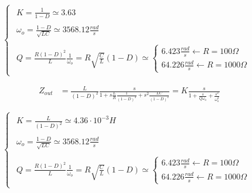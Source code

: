 \documentclass{article}
\begin{document}
\vspace{0.5em}
\[
\begin{cases}
    \begin{aligned}
       K = \frac{1}{1-D} \simeq 3.63
    \end{aligned}
       \\[2em]
    \begin{aligned}
       \omega_o = \frac{1-D}{\sqrt{LC}} \simeq 3568.12 \frac{rad}{s}
    \end{aligned}
       \\[2em]
    \begin{aligned}
       Q = \frac{R(1-D)^2}{L} \frac{1}{\omega_o} = R \sqrt{\frac{C}{L}}(1-D) \simeq 
        \begin{cases}
            6.423 \frac{rad}{s} \xleftarrow{} R = 100 \Omega \\
            64.226 \frac{rad}{s} \xleftarrow{} R = 1000 \Omega
        \end{cases}
    \end{aligned}
\end{cases}
\]
\vspace{0.5em}

\vspace{0.5em}
\begin{align*}
    Z_{out} &= \frac{L}{(1-D)^2}\frac{s}{1 + s \frac{L}{R}\frac{1}{(1-D)^2} + s^2 \frac{LC}{(1-D)^2}} = K \frac{s}{1+\frac{s}{Q \omega_o} + \frac{s^2}{\omega_o^2}}
\end{align*}
\vspace{0.5em}

\vspace{0.5em}
\[
\begin{cases}
    \begin{aligned}
       K = \frac{L}{(1-D)^2} \simeq 4.36 \cdot 10^{-3} H
    \end{aligned}
       \\[2em]
    \begin{aligned}
       \omega_o = \frac{1-D}{\sqrt{LC}} \simeq 3568.12 \frac{rad}{s}
    \end{aligned}
       \\[2em]
    \begin{aligned}
       Q = \frac{R(1-D)^2}{L} \frac{1}{\omega_o} = R \sqrt{\frac{C}{L}}(1-D) \simeq 
        \begin{cases}
            6.423 \frac{rad}{s} \xleftarrow{} R = 100 \Omega \\
            64.226 \frac{rad}{s} \xleftarrow{} R = 1000 \Omega
        \end{cases}
    \end{aligned}
\end{cases}
\]
\vspace{0.5em}
\end{document}
